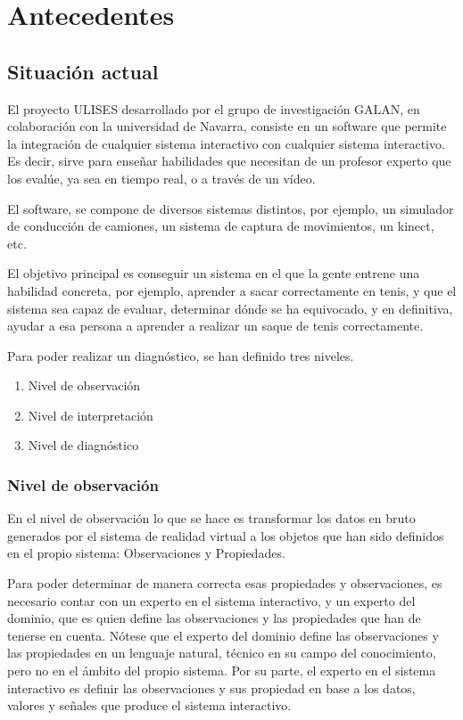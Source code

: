 \chapter{Antecedentes}

\section{Situaci\'on actual}
El proyecto ULISES desarrollado por el grupo de investigaci\'on GALAN, en colaboraci\'on con la universidad de Navarra, 
consiste en un software que permite la integraci\'on de cualquier sistema interactivo con cualquier
sistema interactivo. Es decir, sirve para ense\~nar habilidades que necesitan de un profesor experto que los eval\'ue,
ya sea en tiempo real, o a trav\'es de un v\'ideo.

El software, se compone de diversos sistemas distintos, por ejemplo, un simulador de conducci\'on de camiones,
un sistema de captura de movimientos, un kinect, etc.

El objetivo principal es conseguir un sistema en el que la gente entrene una habilidad concreta, por ejemplo, aprender
a sacar correctamente en tenis, y que el sistema sea capaz de evaluar, determinar d\'onde se ha equivocado, y en definitiva,
ayudar a esa persona a aprender a realizar un saque de tenis correctamente.

Para poder realizar un diagn\'ostico, se han definido tres niveles.

\begin{enumerate}
	\item Nivel de observaci\'on
	\item Nivel de interpretaci\'on
	\item Nivel de diagn\'ostico
\end{enumerate}

\subsection{Nivel de observaci\'on}
En el nivel de observaci\'on lo que se hace es transformar los datos en bruto generados por el sistema de realidad virtual
a los objetos que han sido definidos en el propio sistema: Observaciones y Propiedades.

Para poder determinar de manera correcta esas propiedades y observaciones, es necesario contar con un 
experto en el sistema interactivo, y un experto del dominio, que es quien define las observaciones y las
propiedades que han de tenerse en cuenta. N\'otese que el experto del dominio define las observaciones y las
propiedades en un lenguaje natural, t\'ecnico en su campo del conocimiento, pero no en el \'ambito del propio
sistema. Por su parte, el experto en el sistema interactivo es definir las observaciones y sus propiedad
en base a los datos, valores y se\~nales que produce el sistema interactivo.

